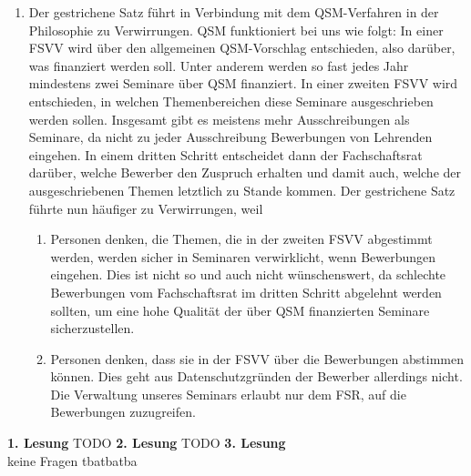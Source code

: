 {\begin{enumerate}
\begin{enumerate}
                    \item Der gestrichene Satz führt in Verbindung mit dem QSM-Verfahren in der Philosophie zu Verwirrungen. QSM funktioniert bei uns wie folgt:
                    In einer FSVV wird über den allgemeinen QSM-Vorschlag entschieden, also darüber, was finanziert werden soll. Unter anderem werden so fast jedes Jahr mindestens zwei Seminare über QSM finanziert.
                    In einer zweiten FSVV wird entschieden, in welchen Themenbereichen diese Seminare ausgeschrieben werden sollen. Insgesamt gibt es meistens mehr Ausschreibungen als Seminare, da nicht zu jeder Ausschreibung Bewerbungen von Lehrenden eingehen.
                    In einem dritten Schritt entscheidet dann der Fachschaftsrat darüber, welche Bewerber den Zuspruch erhalten und damit auch, welche der ausgeschriebenen Themen letztlich zu Stande kommen.
                    Der gestrichene Satz führte nun häufiger zu Verwirrungen, weil 
                    \begin{enumerate}
                        \item Personen denken, die Themen, die in der zweiten FSVV abgestimmt werden, werden sicher in Seminaren verwirklicht, wenn Bewerbungen eingehen. Dies ist nicht so und auch nicht wünschenswert, da schlechte Bewerbungen vom Fachschaftsrat im dritten Schritt abgelehnt werden sollten, um eine hohe Qualität der über QSM finanzierten Seminare sicherzustellen.
                        \item Personen denken, dass sie in der FSVV über die Bewerbungen abstimmen können. Dies geht aus Datenschutzgründen der Bewerber allerdings nicht. Die Verwaltung unseres Seminars erlaubt nur dem FSR, auf die Bewerbungen zuzugreifen.
                    \end{enumerate}
                \end{enumerate} 
        \end{enumerate}
    }{
        \textbf{1. Lesung}
        TODO
        \textbf{2. Lesung}
        TODO
        \textbf{3. Lesung}\\
        keine Fragen
    }{tba}{tba}{tba}
